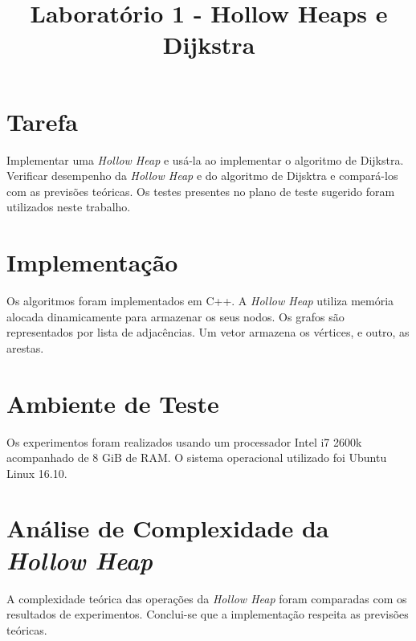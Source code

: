 \documentclass{iiufrgs}
\title{Laboratório 1 - Hollow Heaps e Dijkstra}
\author{}{Thiago Bell}
\begin{document}
\maketitle

\setcounter{chapter}{1}

\section{Tarefa}
Implementar uma \textit{Hollow Heap} e usá-la ao implementar o algoritmo de Dijkstra. 
Verificar desempenho da \textit{Hollow Heap} e do algoritmo de Dijsktra e compará-los com as previs\~oes teóricas.
Os testes presentes no plano de teste sugerido foram utilizados neste trabalho.

\section{Implementaç\~ao}
Os algoritmos foram implementados em C++. A \textit{Hollow Heap} utiliza memória alocada dinamicamente para armazenar os seus nodos.
Os grafos s\~ao representados por lista de adjacências. Um vetor armazena os vértices, e outro, as arestas.

\section{Ambiente de Teste}
Os experimentos foram realizados usando um processador Intel i7 2600k acompanhado de 8 GiB de RAM. 
O sistema operacional utilizado foi Ubuntu Linux 16.10.

\section{Análise de Complexidade da \textit{Hollow Heap}}
A complexidade teórica das operaç\~oes da \textit{Hollow Heap} foram comparadas com os resultados de experimentos.
Conclui-se que a implementaç\~ao respeita as previs\~oes teóricas.
\end{document}

